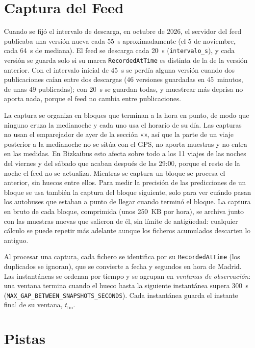 \section{Captura del Feed}
\label{sec:captura}

Cuando se fijó el intervalo de descarga, en octubre de 2026, el servidor del feed publicaba una versión nueva cada
55~s aproximadamente (el 5 de noviembre, cada 64~s de mediana). El feed se descarga cada 20~s (\texttt{intervalo\_s}),
y cada versión se guarda solo si su marca \texttt{RecordedAtTime} es distinta de la de la versión anterior. Con el intervalo
inicial de 45~s se perdía alguna versión cuando dos publicaciones caían entre dos descargas (46 versiones guardadas en
45~minutos, de unas 49 publicadas); con 20~s se guardan todas, y muestrear más deprisa no aporta nada, porque el feed
no cambia entre publicaciones.

La captura se organiza en bloques que terminan a la hora en punto, de modo que ninguno cruza la medianoche y cada uno
usa el horario de su día. Las capturas no usan el emparejador de ayer de la sección «», así que
la parte de un viaje posterior a la medianoche no se sitúa con el GPS, no aporta muestras y no entra en las medidas. En
Bizkaibus esto afecta sobre todo a los 11 viajes de las noches del viernes y del sábado que acaban después de las 29:00, porque el resto de la
noche el feed no se actualiza. Mientras se captura un bloque se procesa el anterior, sin huecos entre ellos. Para medir la
precisión de las predicciones de un bloque se usa también la captura del bloque siguiente, solo para ver cuándo
pasan los autobuses que estaban a punto de llegar cuando terminó el bloque. La captura en bruto de cada bloque,
comprimida (unos 250~KB por hora), se archiva junto con las muestras nuevas que salieron de él, sin límite de
antigüedad: cualquier cálculo se puede repetir más adelante aunque los ficheros acumulados descarten lo antiguo.

Al procesar una captura, cada fichero se identifica por su \texttt{RecordedAtTime} (los duplicados se ignoran), que se
convierte a fecha y segundos en hora de Madrid. Las instantáneas se ordenan por tiempo y se
agrupan en \emph{ventanas de observación}: una ventana termina cuando el hueco hasta la siguiente instantánea supera
300~s (\texttt{MAX\_GAP\_BETWEEN\_SNAPSHOTS\_SECONDS}). Cada instantánea guarda el instante final de su ventana,
$t_{\mathrm{fin}}$.

\section{Pistas}
\label{sec:pistas}

